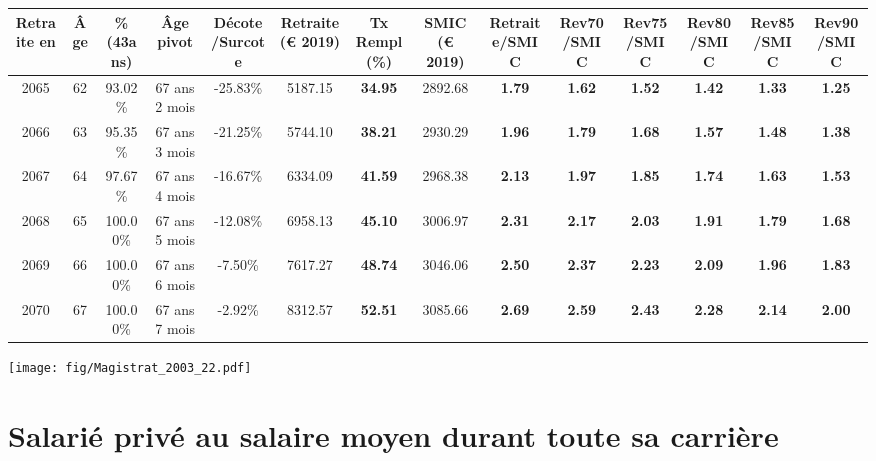 \begin{adjustbox}{max width=\textwidth} 
\begin{tabular}[htb]{|c|c||c|c|c||c|c||c||c|c|c|c|c|c|} 
\hline 
 Retraite en &  Âge &  \%(43ans) &  Âge pivot &  Décote/Surcote &  Retraite (\euro{} 2019) &  Tx Rempl(\%) &  SMIC (\euro{} 2019) &  Retraite/SMIC &  Rev70/SMIC &  Rev75/SMIC &  Rev80/SMIC &  Rev85/SMIC &  Rev90/SMIC \\ 
\hline \hline 
 2065 &  62 &  93.02\% &  67 ans 2 mois &  -25.83\% &  5187.15 &  {\bf 34.95} &  2892.68 &  {\bf 1.79} &  {\bf 1.62} &  {\bf 1.52} &  {\bf 1.42} &  {\bf 1.33} &  {\bf 1.25} \\ 
\hline 
 2066 &  63 &  95.35\% &  67 ans 3 mois &  -21.25\% &  5744.10 &  {\bf 38.21} &  2930.29 &  {\bf 1.96} &  {\bf 1.79} &  {\bf 1.68} &  {\bf 1.57} &  {\bf 1.48} &  {\bf 1.38} \\ 
\hline 
 2067 &  64 &  97.67\% &  67 ans 4 mois &  -16.67\% &  6334.09 &  {\bf 41.59} &  2968.38 &  {\bf 2.13} &  {\bf 1.97} &  {\bf 1.85} &  {\bf 1.74} &  {\bf 1.63} &  {\bf 1.53} \\ 
\hline 
 2068 &  65 &  100.00\% &  67 ans 5 mois &  -12.08\% &  6958.13 &  {\bf 45.10} &  3006.97 &  {\bf 2.31} &  {\bf 2.17} &  {\bf 2.03} &  {\bf 1.91} &  {\bf 1.79} &  {\bf 1.68} \\ 
\hline 
 2069 &  66 &  100.00\% &  67 ans 6 mois &  -7.50\% &  7617.27 &  {\bf 48.74} &  3046.06 &  {\bf 2.50} &  {\bf 2.37} &  {\bf 2.23} &  {\bf 2.09} &  {\bf 1.96} &  {\bf 1.83} \\ 
\hline 
 2070 &  67 &  100.00\% &  67 ans 7 mois &  -2.92\% &  8312.57 &  {\bf 52.51} &  3085.66 &  {\bf 2.69} &  {\bf 2.59} &  {\bf 2.43} &  {\bf 2.28} &  {\bf 2.14} &  {\bf 2.00} \\ 
\hline 
\hline 
\end{tabular} 
\end{adjustbox} 
 
 \vspace{0.1cm} 

 \begin{center}\texttt{[image: fig/Magistrat\_2003\_22.pdf]}\end{center} \label{fig/Magistrat_2003_22.pdf} 

\newpage 
 
\chapter{Salarié privé au salaire moyen durant toute sa carrière} 


